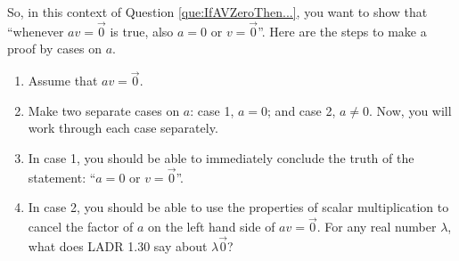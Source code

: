 \documentclass[12pt]{article}
\def\lam{\lambda}
\begin{document}
So, in this context of Question \ref{que:IfAVZeroThen...}, you want to show that ``whenever $av=\vec{0}$ is true, also $a=0$ or $v=\vec{0}$''.    Here are the steps to make a proof by cases on $a$. 

\begin{enumerate}
	\item Assume that $av=\vec{0}$.
	
	\item Make two separate cases on $a$: case 1, $a=0$; and case 2, $a\not=0$.  Now, you will work through each case separately.
	
	\item In case 1, you should be able to immediately conclude the truth of the statement: ``$a=0$ or $v=\vec{0}$''.
	
	\item In case 2, you should be able to use the properties of scalar multiplication to cancel the factor of $a$ on the left hand side of $av=\vec{0}$.  For any real number $\lam$, what does LADR 1.30 say about $\lam\vec{0}$? 
\end{enumerate}


















\end{document}
